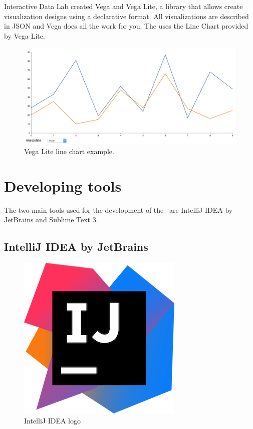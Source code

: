 Interactive Data Lab created Vega and Vega Lite, a library that allows create visualization designs using a declarative format. All visualizations are described in JSON\cite{json} and Vega does all the work for you. The  uses the Line Chart provided by Vega Lite.

\begin{figure}[H]
\centering
\includegraphics[scale=0.4]{resources/lineal-chart-example01.png}
\caption{Vega Lite line chart example.}
\end{figure}

\section{Developing tools}

The two main tools used for the development of the \thesis\ are IntelliJ IDEA by JetBrains and Sublime Text 3.

\subsection*{IntelliJ IDEA by JetBrains\cite{intellij}}

\begin{figure}[H]
\centering
\includegraphics[scale=0.1]{resources/intellij-logo.png}
\caption{IntelliJ IDEA logo}
\end{figure}

